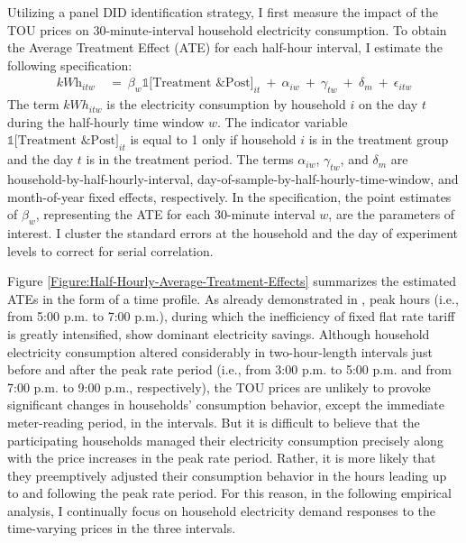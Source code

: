 Utilizing a panel DID identification strategy, I first measure the impact of the TOU prices on 30-minute-interval household electricity consumption. To obtain the Average Treatment Effect (ATE) for each half-hour interval, I estimate the following specification:
\begin{equation}
\begin{split}
    \textit{kWh}_{itw} \ 
    & = \ \beta_{w} \mathbb{1}\big[ \text{Treatment \& Post} \big]_{it} \ + \ \alpha_{iw} \ + \ \gamma_{tw} \ + \ \delta_{m} \ + \ \epsilon_{itw}
\end{split}
\label{Eq:Model-Specification_Half-Hourly-Average-Treatment-Effects}
\end{equation}
The term $kWh_{itw}$ is the electricity consumption by household $i$ on the day $t$ during the half-hourly time window $w$. The indicator variable $\mathbb{1}\big[ \text{Treatment \& Post} \big]_{it}$ is equal to 1 only if household $i$ is in the treatment group and the day $t$ is in the treatment period. The terms $\alpha_{iw}$, $\gamma_{tw}$, and $\delta_{m}$ are household-by-half-hourly-interval, day-of-sample-by-half-hourly-time-window, and month-of-year fixed effects, respectively. In the specification, the point estimates of $\beta_{w}$, representing the ATE for each 30-minute interval $w$, are the parameters of interest. I cluster the standard errors at the household and the day of experiment levels to correct for serial correlation.

Figure \ref{Figure:Half-Hourly-Average-Treatment-Effects} summarizes the estimated ATEs in the form of a time profile. As already demonstrated in \cite{Peaking-Interest:How-Awareness-Drives-the-Effectiveness-of-Time-of-Use-Electricity-Pricing_Prest_2020}, peak hours (i.e., from 5:00 p.m. to 7:00 p.m.), during which the inefficiency of fixed flat rate tariff is greatly intensified, show dominant electricity savings. Although household electricity consumption altered considerably in two-hour-length intervals just before and after the peak rate period (i.e., from 3:00 p.m. to 5:00 p.m. and from 7:00 p.m. to 9:00 p.m., respectively), the TOU prices are unlikely to provoke significant changes in households' consumption behavior, except the immediate meter-reading period, in the intervals. But it is difficult to believe that the participating households managed their electricity consumption precisely along with the price increases in the peak rate period. Rather, it is more likely that they preemptively adjusted their consumption behavior in the hours leading up to and following the peak rate period. For this reason, in the following empirical analysis, I continually focus on household electricity demand responses to the time-varying prices in the three intervals. 